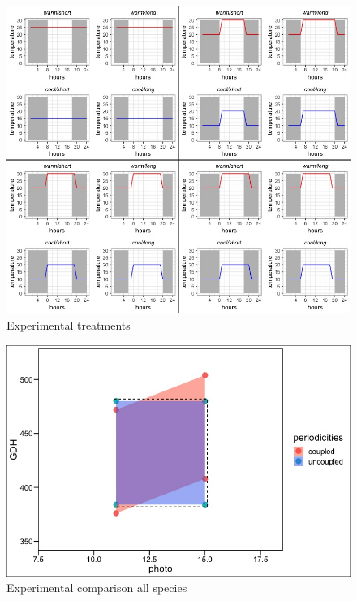 \documentclass[12pt]{article}\usepackage[]{graphicx}\usepackage[]{color}
\begin{document}
  

\begin{figure}[h!]
    \centering
 \includegraphics[width=\textwidth]{..//Plots/periodicity_figures/new_treats.jpeg}
    \caption{Experimental treatments}
    \label{fig:Figure 1}
\end{figure}

\begin{figure}[h!]
    \centering
 \includegraphics[width=\textwidth]{..//Plots/periodicity_figures/Uncoupled_coupled.jpeg}
    \caption{Experimental comparison all species}
    \label{fig:Figure 2}
\end{figure}
\end{document}
